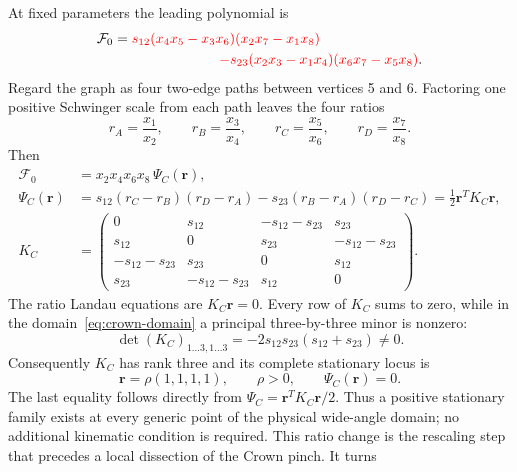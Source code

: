 \documentclass[a4paper,11pt]{article}
\newcommand{\SLcolour}[1]{{\color{red}#1}}
\begin{document}
At fixed parameters the leading polynomial is
\begin{align}
 \mathcal F_0={}&
 \SLcolour{s_{12}(x_4x_5-x_3x_6)(x_2x_7-x_1x_8)}
 \nonumber\\
 &\hspace{22mm}
 \SLcolour{-s_{23}(x_2x_3-x_1x_4)(x_6x_7-x_5x_8)}.
 \label{eq:crown-F0}
\end{align}
Regard the graph as four two-edge paths between vertices 5 and 6.  Factoring
one positive Schwinger scale from each path leaves the four ratios
\begin{equation}
 r_A=\frac{x_1}{x_2},\qquad r_B=\frac{x_3}{x_4},\qquad
 r_C=\frac{x_5}{x_6},\qquad r_D=\frac{x_7}{x_8}.
 \label{eq:crown-path-ratios}
\end{equation}
Then
\begin{align}
 \mathcal F_0&=x_2x_4x_6x_8\,\Psi_C(\boldsymbol r),\nonumber\\
 \Psi_C(\boldsymbol r)
 &=s_{12}(r_C-r_B)(r_D-r_A)
   -s_{23}(r_B-r_A)(r_D-r_C)
   =\frac12\boldsymbol r^T K_C\boldsymbol r,
 \label{eq:crown-ratio-quadratic}\\[-1mm]
 K_C&=\begin{pmatrix}
 0&s_{12}&-s_{12}-s_{23}&s_{23}\\
 s_{12}&0&s_{23}&-s_{12}-s_{23}\\
 -s_{12}-s_{23}&s_{23}&0&s_{12}\\
 s_{23}&-s_{12}-s_{23}&s_{12}&0
 \end{pmatrix}.
 \nonumber
\end{align}
The ratio Landau equations are \(K_C\boldsymbol r=0\).  Every row of \(K_C\)
sums to zero, while in the domain~\eqref{eq:crown-domain} a principal
three-by-three minor is nonzero:
\begin{equation}
 \det (K_C)_{1\ldots3,1\ldots3}
 =-2s_{12}s_{23}(s_{12}+s_{23})\ne0.
 \label{eq:crown-ratio-rank}
\end{equation}
Consequently \(K_C\) has rank three and its complete stationary locus is
\begin{equation}
 \boldsymbol r=\rho(1,1,1,1),\qquad \rho>0,
 \qquad \Psi_C(\boldsymbol r)=0.
 \label{eq:crown-ratio-stationarity}
\end{equation}
The last equality follows directly from
\(\Psi_C=\boldsymbol r^TK_C\boldsymbol r/2\).  Thus a positive stationary
family exists at every generic point of the physical wide-angle domain; no
additional kinematic condition is required.  This ratio change is the
rescaling step that precedes a local dissection of the Crown pinch.  It turns
\end{document}
